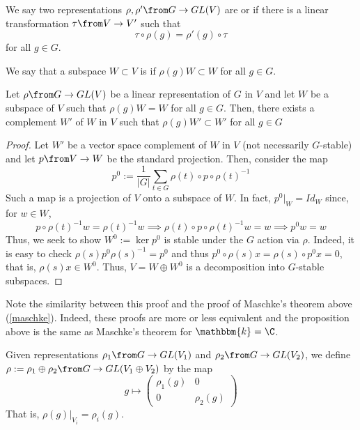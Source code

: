 \documentclass[11pt,leqno,oneside]{amsbook}
\newcommand{\bbk}{\mathbbm{k}}
\numberwithin{thm}{section}
\begin{document}
\begin{defn}
  We say two representations \(\rho, \rho' \from G \to GL(V)\) are
   or  if 
  there is a linear transformation \(\tau \from V \to V'\) such
  that \[
    \tau \circ \rho(g) = \rho'(g) \circ \tau
  \]
  for all \(g \in G\).
\end{defn}
\begin{defn}
  We say that a subspace \(W \subset V\) is  if
  \(\rho(g)W \subset W\) for all \(g \in G\).
\end{defn}
\begin{prop}
  Let \(\rho \from G \to GL(V)\) be a linear representation of \(G\)
  in \(V\) and let \(W\) be a subspace of \(V\) such that \(\rho(g)W =
  W\) for all \(g \in G\). Then, there exists a complement \(W'\) of
  \(W\) in \(V\) such that \(\rho(g)W' \subset W'\) for all \(g \in G\)
\end{prop}
\begin{proof}
  Let \(W'\) be a vector space complement of \(W\) in \(V\) (not
  necessarily \(G\)-stable) and let \(p \from V \to W\) be the
  standard projection. Then, consider the map \[
    p^0 := \frac{1}{|G|} \sum_{t \in G} \rho(t) \circ p \circ \rho(t)^{-1}
  \]
  Such a map is a projection of \(V\) onto a subspace of \(W\). In
  fact, \(p^0|_W = Id_W\) since, for \(w \in W\), \[
    p \circ \rho(t)^{-1} w = \rho(t)^{-1} w \implies \rho(t) \circ p
    \circ \rho(t)^{-1} w = w \implies p^0 w = w
  \]
  Thus, we seek to show \(W^0 := \ker p^0\) is stable under the \(G\)
  action via \(\rho\). Indeed, it is easy to check \(\rho(s) p^0
  \rho(s)^{-1} = p^0\) and thus \(p^0 \circ \rho(s)x = \rho(s) \circ
  p^0 x = 0\), that is, \(\rho(s) x \in W^0\). Thus, \(V = W \oplus
  W^0\) is a decomposition into \(G\)-stable subspaces. 
\end{proof}
\begin{rmk}
  Note the similarity between this proof and the proof of Maschke's
  theorem above (\ref{maschke}). Indeed, these proofs are more or less
  equivalent and the proposition above is the same as Maschke's
  theorem for \(\bbk = \C\).
\end{rmk}
\begin{defn}
  Given representations \(\rho_1 \from G \to GL(V_1)\) and \(\rho_2 \from
  G \to GL(V_2)\), we define \(\rho := \rho_1 \oplus \rho_2 \from G \to GL(V_1
  \oplus V_2)\) by the map \[
    g \mapsto \left(
      \begin{array}{cc}
        \rho_1(g)&0\\
        0&\rho_2(g)
      \end{array}
    \right)
  \]
  That is, \(\rho(g)|_{V_i} = \rho_i(g)\).
\end{defn}
\end{document}
